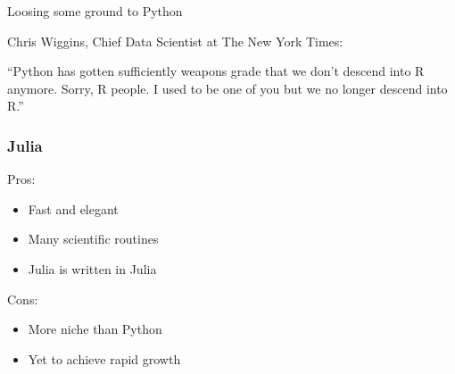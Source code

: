\begin{frame}
    
    Loosing some ground to Python
            \vspace{0.5em}
            \vspace{0.5em}
            \vspace{0.5em}

    \Eg Chris Wiggins, Chief Data Scientist at The New York Times:

            \vspace{0.5em}
     ``Python has gotten sufficiently weapons grade that we don't descend into
     R anymore. Sorry, R people. I used to be one of you but we no longer
     descend into R.''


\end{frame}


\begin{frame}
    \frametitle{Julia}

    Pros:
    
    \begin{itemize}
        \item Fast and elegant
            \vspace{0.5em}
        \item Many scientific routines
            \vspace{0.5em}
        \item Julia is written in Julia
    \end{itemize}

            \vspace{0.5em}
            \vspace{0.5em}
            \vspace{0.5em}
    Cons:
    
    \begin{itemize}
        \item More niche than Python
            \vspace{0.5em}
        \item Yet to achieve rapid growth
    \end{itemize}

\end{frame}




